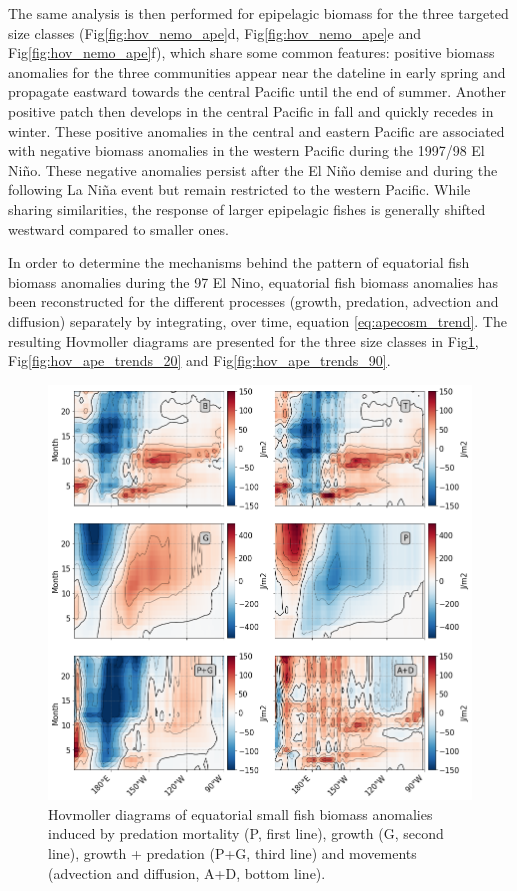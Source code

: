 The same analysis is then performed for epipelagic biomass for the three targeted size classes (Fig\ref{fig:hov_nemo_ape}d, Fig\ref{fig:hov_nemo_ape}e and Fig\ref{fig:hov_nemo_ape}f), which share some common features: positive biomass anomalies for the three communities appear near the dateline in early spring and propagate eastward towards the central Pacific until the end of summer. Another positive patch then develops in the central Pacific in fall and quickly recedes in winter. These positive anomalies in the central and eastern Pacific  are associated with negative biomass anomalies in the western Pacific during the 1997/98 El Niño. These negative anomalies persist after the El Niño demise and during the following La Niña event but remain restricted to the western Pacific. While sharing similarities, the response of larger epipelagic fishes is generally shifted westward compared to smaller ones.

In order to determine the mechanisms behind the pattern of equatorial fish biomass anomalies during the 97 El Nino, equatorial fish biomass anomalies has been reconstructed for the different processes (growth, predation, advection and diffusion) separately by integrating, over time, equation \ref{eq:apecosm_trend}. The resulting Hovmoller diagrams are presented for the three size classes in Fig\ref{fig:hov_ape_trends_3}, 
Fig\ref{fig:hov_ape_trends_20} and Fig\ref{fig:hov_ape_trends_90}.

\begin{figure}[htp]
	\centering
	\includegraphics[scale=0.4]{figs/hov_compo_l_3.png}	
	\caption{Hovmoller diagrams of equatorial small fish biomass anomalies induced by predation mortality (P, first line), growth (G, second line), growth + predation (P+G, third line) and movements (advection and diffusion, A+D, bottom line).}	
	\label{fig:hov_ape_trends_3}
\end{figure}

